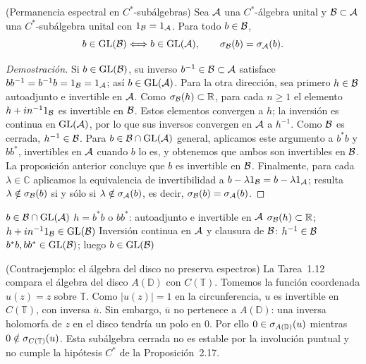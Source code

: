 \begin{cthproposicion}{(Permanencia espectral en $C^*$-subálgebras)}
Sea $\mathcal A$ una $C^*$-álgebra unital y $\mathcal B\subset\mathcal A$ una $C^*$-subálgebra unital
con $1_\mathcal B=1_\mathcal A$. Para todo $b\in\mathcal B$,
\[
 b\in\operatorname{GL}(\mathcal B)\Longleftrightarrow b\in\operatorname{GL}(\mathcal A),
 \qquad
 \sigma_\mathcal B(b)=\sigma_\mathcal A(b).
\]
\end{cthproposicion}

\begin{proof}[Demostración]
Si $b\in\operatorname{GL}(\mathcal B)$, su inverso $b^{-1}\in\mathcal B\subset\mathcal A$ satisface
$bb^{-1}=b^{-1}b=1_\mathcal B=1_\mathcal A$; así $b\in\operatorname{GL}(\mathcal A)$.
Para la otra dirección, sea primero $h\in\mathcal B$ autoadjunto e invertible en $\mathcal A$.
Como $\sigma_\mathcal B(h)\subset\mathbb R$, para cada $n\ge1$ el elemento
$h+i n^{-1}1_\mathcal B$ es invertible en $\mathcal B$. Estos elementos convergen a $h$;
la inversión es continua en $\operatorname{GL}(\mathcal A)$, por lo que sus inversos convergen en $\mathcal A$
a $h^{-1}$. Como $\mathcal B$ es cerrada, $h^{-1}\in\mathcal B$.
Para $b\in\mathcal B\cap\operatorname{GL}(\mathcal A)$ general, aplicamos este argumento a $b^*b$ y $bb^*$,
invertibles en $\mathcal A$ cuando $b$ lo es, y obtenemos que ambos son invertibles en $\mathcal B$.
La proposición anterior concluye que $b$ es invertible en $\mathcal B$.
Finalmente, para cada $\lambda\in\mathbb C$ aplicamos la equivalencia de
invertibilidad a $b-\lambda1_\mathcal B=b-\lambda1_\mathcal A$; resulta
$\lambda\notin\sigma_\mathcal B(b)$ si y sólo si
$\lambda\notin\sigma_\mathcal A(b)$, es decir,
$\sigma_\mathcal B(b)=\sigma_\mathcal A(b)$.
\end{proof}

\proofdiagrambranch
{$b\in\mathcal B\cap\operatorname{GL}(\mathcal A)$}
{$h=b^*b$ o $bb^*$: autoadjunto e invertible en $\mathcal A$}
{$\sigma_\mathcal B(h)\subset\mathbb R$; $h+i n^{-1}1_\mathcal B\in\operatorname{GL}(\mathcal B)$}
{Inversión continua en $\mathcal A$ y clausura de $\mathcal B$: $h^{-1}\in\mathcal B$}
{$b^*b,bb^*\in\operatorname{GL}(\mathcal B)$; luego $b\in\operatorname{GL}(\mathcal B)$}

\begin{cthejemplo}{(Contraejemplo: el álgebra del disco no preserva espectros)}
La Tarea~1.12 compara el álgebra del disco $A(\mathbb D)$ con $C(\mathbb T)$.
Tomemos la función coordenada $u(z)=z$ sobre $\mathbb T$. Como
$|u(z)|=1$ en la circunferencia, $u$ es invertible en $C(\mathbb T)$,
con inversa $\overline u$. Sin embargo, $\overline u$ no pertenece a
$A(\mathbb D)$: una inversa holomorfa de $z$ en el disco tendría un polo
en $0$. Por ello $0\in\sigma_{A(\mathbb D)}(u)$ mientras
$0\notin\sigma_{C(\mathbb T)}(u)$.
Esta subálgebra cerrada no es estable por la involución puntual y no cumple
la hipótesis $C^*$ de la Proposición~2.17.
\end{cthejemplo}

